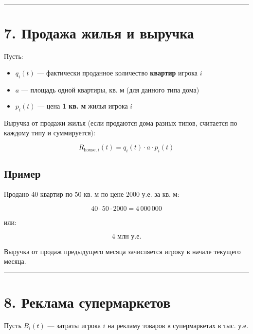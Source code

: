 \documentclass[
]{article}
\providecommand{\tightlist}{%
  \setlength{\itemsep}{0pt}\setlength{\parskip}{0pt}}
\begin{document}
\begin{center}\rule{0.5\linewidth}{0.5pt}\end{center}

\section{7. Продажа жилья и
выручка}\label{ux43fux440ux43eux434ux430ux436ux430-ux436ux438ux43bux44cux44f-ux438-ux432ux44bux440ux443ux447ux43aux430}

Пусть:

\begin{itemize}
\tightlist
\item
  \(q_i(t)\) --- фактически проданное количество \textbf{квартир} игрока
  \(i\)
\item
  \(a\) --- площадь одной квартиры, кв. м (для данного типа дома)
\item
  \(p_i(t)\) --- цена \textbf{1 кв. м} жилья игрока \(i\)
\end{itemize}

Выручка от продажи жилья (если продаются дома разных типов, считается по
каждому типу и суммируется):

\[
R_{\text{house},i}(t)
=
q_i(t)
\cdot
a
\cdot
p_i(t)
\]

\subsection{Пример}\label{ux43fux440ux438ux43cux435ux440-1}

Продано 40 квартир по 50 кв. м по цене 2000 у.е. за кв. м:

\[
40 \cdot 50 \cdot 2000
=
4\,000\,000
\]

или:

\[
4\text{ млн у.е.}
\]

Выручка от продаж предыдущего месяца зачисляется игроку в начале
текущего месяца.

\begin{center}\rule{0.5\linewidth}{0.5pt}\end{center}

\section{8. Реклама
супермаркетов}\label{ux440ux435ux43aux43bux430ux43cux430-ux441ux443ux43fux435ux440ux43cux430ux440ux43aux435ux442ux43eux432}

Пусть \(B_i(t)\) --- затраты игрока \(i\) на рекламу товаров в
супермаркетах в тыс. у.е.
\end{document}
